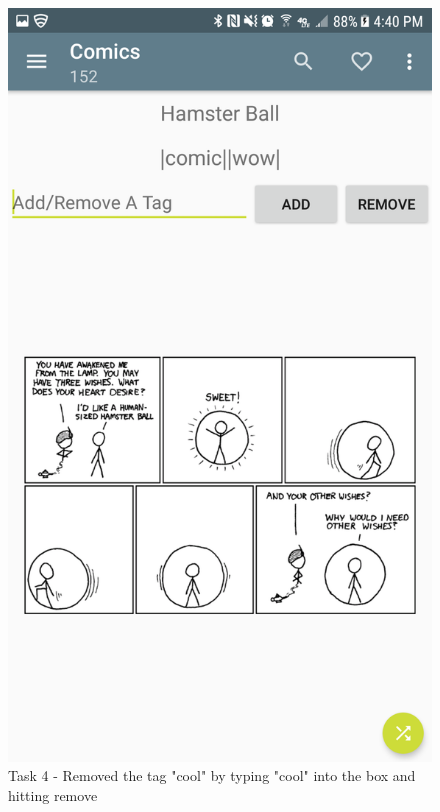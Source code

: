 \documentclass{article}
\makeatletter
\def\maxwidth#1{\ifdim\Gin@nat@width>#1 #1\else\Gin@nat@width\fi}
\makeatother
\begin{document}
	\begin{figure}[ht]
		\includegraphics[width=\maxwidth{3in}]{img/t4s3.png}
		\centering
        \caption{Task 4 - Removed the tag "cool" by typing "cool" into the box and hitting remove}
	\end{figure}
\end{document}
